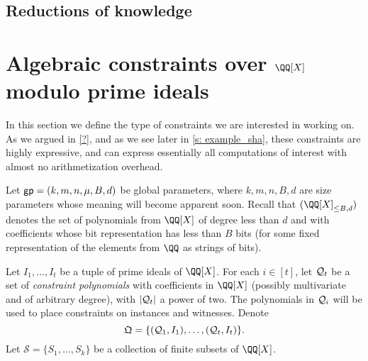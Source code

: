 \documentclass[11pt,letterpaper,usenames,dvipsnames]{article}
\begin{document}
\subsection{Reductions of knowledge}

\section{Algebraic constraints over $\QQ[X]$ modulo prime ideals}

In this section we define the type of constraints we are interested in working on. As we argued in \cref{?}, and as we see later in \cref{s: example_sha}, these constraints are highly expressive, and can  express essentially all computations of interest with almost no arithmetization overhead.

\newcommand{\evalconstraints}{\text{\emph{Eval}}}
\newcommand{\mainQpolyring}{(\QQ[X]_{\leq B, d})}
\newcommand{\mainQpolyringmultilin}{(\QQ[X]_{\leq B, d})^{\multilin}}



%

\newcommand{\megaQ}{\mathfrak{Q}}
\renewcommand{\ff}{\mathbf{f}}
\newcommand{\cS}{\mathcal{S}}
\newcommand{\gpunrolled}{(k, m, n, \mu, B, d)}

Let $\gp = \gpunrolled$ be global parameters, where $k,m,n,B,d$ are size parameters whose meaning will become apparent soon. Recall that $\mainQpolyring$ denotes the set of polynomials from $\QQ[X]$ of degree less than $d$ and with coefficients whose bit representation has less than $B$ bits (for some fixed representation of the elements from $\QQ$ as strings of bits).

Let $I_1,\ldots, I_t$ be a tuple of prime ideals of $\QQ[X]$. For each $i\in [t]$, let $\mathcal{Q}_t$ be a set  of \emph{constraint polynomials} with coefficients in $\QQ[X]$ (possibly multivariate and of arbitrary degree), with $|\mathcal{Q}_t|$ a power of two.  The polynomials in $\mathcal{Q}_i$ will be used to place constraints on instances and witnesses.
Denote 
%
$$
\megaQ = \{(\cQ_1, I_1), \ldots, (\cQ_t, I_t)\}.
$$
%
Let $\cS=\{S_1, \ldots, S_k\}$ be a collection of finite subsets of $\QQ[X]$.
%
\end{document}

